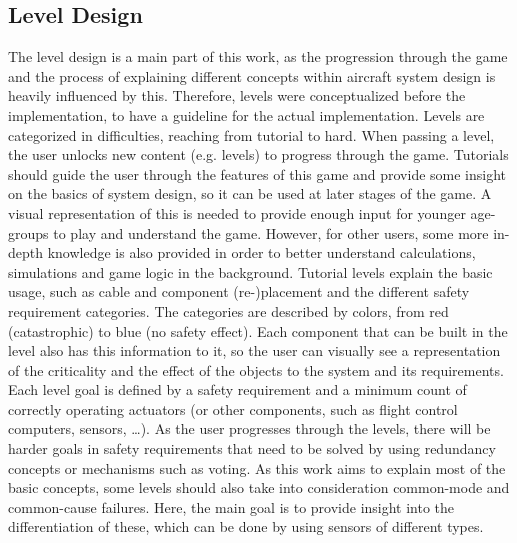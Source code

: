 \subsection{Level Design}\label{subsec:level-design}
The level design is a main part of this work, as the progression through the game and the process of explaining different concepts
within aircraft system design is heavily influenced by this.
Therefore, levels were conceptualized before the implementation, to have a guideline for the actual implementation.
Levels are categorized in difficulties, reaching from tutorial to hard.
When passing a level, the user unlocks new content (e.g. levels) to progress through the game.
Tutorials should guide the user through the features of this game and provide some insight on the basics of system design, so
it can be used at later stages of the game.
A visual representation of this is needed to provide enough input for younger age-groups to play and understand the game.
However, for other users, some more in-depth knowledge is also provided in order to better understand calculations, simulations and
game logic in the background.
Tutorial levels explain the basic usage, such as cable and component (re-)placement and the different safety requirement
categories.
The categories are described by colors, from red (catastrophic) to blue (no safety effect).
Each component that can be built in the level also has this information to it, so the user can visually see a representation
of the criticality and the effect of the objects to the system and its requirements.
Each level goal is defined by a safety requirement and a minimum count of correctly operating actuators (or other components, such
as flight control computers, sensors, \ldots).
As the user progresses through the levels, there will be harder goals in safety requirements that need to be solved by using
redundancy concepts or mechanisms such as voting.
As this work aims to explain most of the basic concepts, some levels should also take into consideration common-mode and common-cause
failures.
Here, the main goal is to provide insight into the differentiation of these, which can be done by using sensors of different types.

\\ \\

